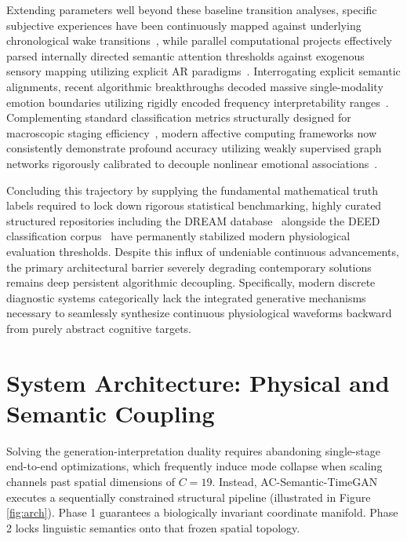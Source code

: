 \documentclass[journal]{IEEEtran}
\begin{document}
Extending parameters well beyond these baseline transition analyses, specific subjective experiences have been continuously mapped against underlying chronological wake transitions~\cite{diezig2024eeg}, while parallel computational projects effectively parsed internally directed semantic attention thresholds against exogenous sensory mapping utilizing explicit AR paradigms~\cite{10.3389/fnhum.2019.00348}. Interrogating explicit semantic alignments, recent algorithmic breakthroughs decoded massive single-modality emotion boundaries utilizing rigidly encoded frequency interpretability ranges~\cite{amrita2025single, amrita2022eeg}. Complementing standard classification metrics structurally designed for macroscopic staging efficiency~\cite{anitha2024efficient}, modern affective computing frameworks now consistently demonstrate profound accuracy utilizing weakly supervised graph networks rigorously calibrated to decouple nonlinear emotional associations~\cite{naidu2024emotion}. 

Concluding this trajectory by supplying the fundamental mathematical truth labels required to lock down rigorous statistical benchmarking, highly curated structured repositories including the DREAM database~\cite{wong2023dream} alongside the DEED classification corpus~\cite{zheng2022deed} have permanently stabilized modern physiological evaluation thresholds. Despite this influx of undeniable continuous advancements, the primary architectural barrier severely degrading contemporary solutions remains deep persistent algorithmic decoupling. Specifically, modern discrete diagnostic systems categorically lack the integrated generative mechanisms necessary to seamlessly synthesize continuous physiological waveforms backward from purely abstract cognitive targets.

\section{System Architecture: Physical and Semantic Coupling}

Solving the generation-interpretation duality requires abandoning single-stage end-to-end optimizations, which frequently induce mode collapse when scaling channels past spatial dimensions of $C=19$. Instead, AC-Semantic-TimeGAN executes a sequentially constrained structural pipeline (illustrated in Figure \ref{fig:arch}). Phase 1 guarantees a biologically invariant coordinate manifold. Phase 2 locks linguistic semantics onto that frozen spatial topology.
\end{document}
